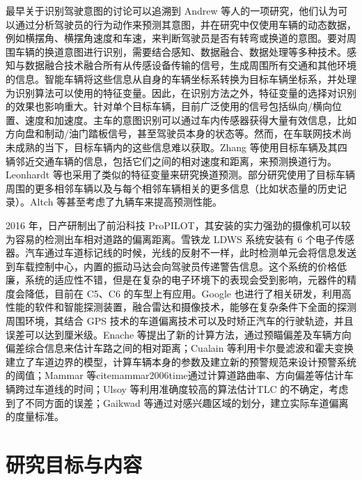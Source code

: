 最早关于识别驾驶意图的讨论可以追溯到 Andrew 等人的一项研究\cite{liu1997realtime}，他们认为可以通过分析驾驶员的行为动作来预测其意图，并在研究中仅使用车辆的动态数据，例如横摆角、横摆角速度和车速，来判断驾驶员是否有转弯或换道的意图。要对周围车辆的换道意图进行识别，需要结合感知、数据融合、数据处理等多种技术\cite{zhang2023highway}。感知与数据融合技术融合所有从传感设备传输的信号，生成周围所有交通和其他环境的信息。智能车辆将这些信息从自身的车辆坐标系转换为目标车辆坐标系，并处理为识别算法可以使用的特征变量。因此，在识别方法之外，特征变量的选择对识别的效果也影响重大。针对单个目标车辆，目前广泛使用的信号包括纵向/横向位置、速度和加速度\cite{woo2017lane}。主车的意图识别可以通过车内传感器获得大量有效信息，比如方向盘和制动/油门踏板信号，甚至驾驶员本身的状态等。然而，在车联网技术尚未成熟的当下，目标车辆内的这些信息难以获取。Zhang 等\cite{zhang2018lane}使用目标车辆及其四辆邻近交通车辆的信息，包括它们之间的相对速度和距离，来预测换道行为。Leonhardt 等\cite{leonhardt2017feature}也采用了类似的特征变量来研究换道预测。部分研究使用了目标车辆周围的更多相邻车辆以及与每个相邻车辆相关的更多信息（比如状态量的历史记录）\cite{patel2018predicting}。Altch 等\cite{altche2017lstm}甚至考虑了九辆车来提高预测性能。

2016 年，日产研制出了前沿科技 ProPILOT，其安装的实力强劲的摄像机可以较为容易的检测出车相对道路的偏离距离\cite{zhang2016nissan}。雪铁龙 LDWS 系统安装有 6 个电子传感器。汽车通过车道标记线的时候，光线的反射不一样，此时检测单元会将信息发送到车载控制中心，内置的振动马达会向驾驶员传递警告信息。这个系统的价格低廉，系统的适应性不错，但是在复杂的电子环境下的表现会受到影响，元器件的精度会降低，目前在 C5、C6 的车型上有应用。Google 也进行了相关研发，利用高性能的软件和智能探测装置，融合雷达和摄像技术，能够在复杂条件下全面的探测周围环境\cite{wang2020autonomous}，其结合 GPS 技术的车道偏离技术可以及时矫正汽车的行驶轨迹，并且误差可以达到厘米级。Enache 等\cite{enache2009driver}提出了新的计算方法，通过预瞄偏差及车辆方向偏差综合信息来估计车路之间的相对距离；Cualain 等\cite{cualain2012automotive}利用卡尔曼滤波和霍夫变换建立了车道边界的模型，计算车辆本身的参数及建立新的预警规范来设计预警系统的阈值；Mammar 等cite{mammar2006time}通过计算道路曲率、方向偏差等估计车辆跨过车道线的时间；Ulsoy 等\cite{chiu1996time}利用准确度较高的算法估计TLC 的不确定，考虑到了不同方面的误差；Gaikwad 等\cite{gaikwad2015lane}通过对感兴趣区域的划分，建立实际车道偏离的度量标准。

\section{研究目标与内容}

